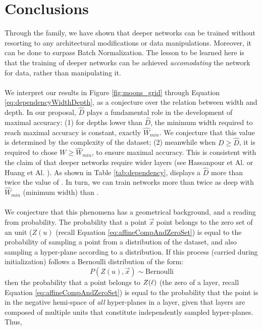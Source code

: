 \section{Conclusions}\label{sec:conclusions}
Through the \SepConstraint family, we have shown that deeper networks can be trained without resorting to any architectural modifications or data manipulations. Moreover, it can be done to surpass Batch Normalization. The lesson to be learned here is that the training of deeper networks can be achieved \emph{accomodating} the network for data, rather than manipulating it.
\\\\
We interpret our results in Figure \ref{fig:moons_grid} through Equation \ref{eq:dependencyWidthDepth}, as a conjecture over the relation between width and depth. In our proposal, $\hat{D}$ plays a fundamental role in the development of maximal accuracy: (1) for depths lower than $\hat{D}$, the minimum width required to reach maximal accuracy is constant, exactly $\hat{W}_{min}$. We conjecture that this value is determined by the complexity of the dataset; (2) meanwhile when  $D\geq \hat{D}$, it is required to chose $W \geq \hat{W}_{min}$, to ensure maximal accuracy. This is consistent with the claim of that deeper networks require wider layers (see Hassanpour et Al. \cite{simpnet} or Huang et Al. \cite{densenet}). As shown in Table \ref{tab:dependency}, \SepUnitPoint displays a $\hat{D}$ more than twice the value of \ReLUBN. In turn, we can train networks more than twice as deep with $\hat{W}_{min}$ (minimum width) than \ReLUBN. 
\\\\
We conjecture that this phenomena has a geometrical background, and a reading from probability. The probability that a point $\vec{x}$ point belongs to the zero set of an unit ($Z(u)$ (recall Equation \ref{eq:affineCompAndZeroSet}) is equal to the probability of sampling a point from a distribution of the dataset, and also sampling a hyper-plane according to a distribution. If this process (carried during initialization) follows a Bernoulli distribution of the form:
\begin{equation}
    P(Z(u), \vec{x}) \sim \text{Bernoulli}
    \label{eq:probabilityUnit}
\end{equation}
then the probability that a point belongs to $Z(\ell)$ (the zero of a layer, recall Equation \ref{eq:affineCompAndZeroSet}) is equal to the probability that the point is in the negative hemi-space of \emph{all} hyper-planes in a layer, given that layers are composed of multiple units that constitute independently sampled hyper-planes. Thus,
